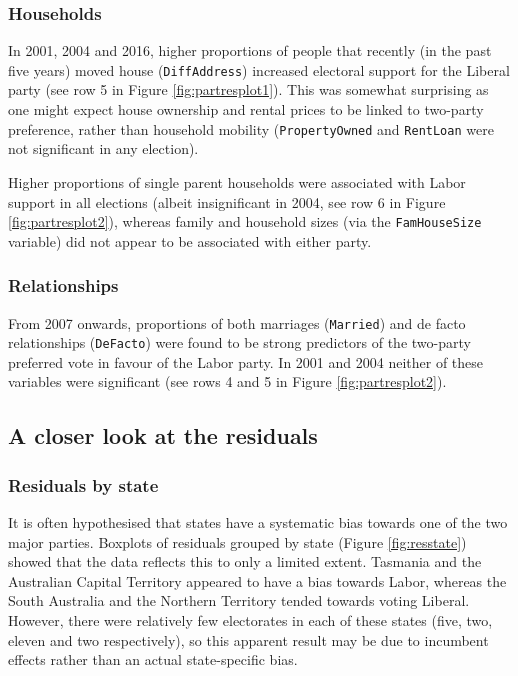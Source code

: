 \documentclass[
  times, doublespace]{anzsauth}
\begin{document}
\hypertarget{households}{%
\subsubsection*{Households}\label{households}}

In 2001, 2004 and 2016, higher proportions of people that recently (in the past five years) moved house (\texttt{DiffAddress}) increased electoral support for the Liberal party (see row 5 in Figure \ref{fig:partresplot1}). This was somewhat surprising as one might expect house ownership and rental prices to be linked to two-party preference, rather than household mobility (\texttt{PropertyOwned} and \texttt{RentLoan} were not significant in any election).

Higher proportions of single parent households were associated with Labor support in all elections (albeit insignificant in 2004, see row 6 in Figure \ref{fig:partresplot2}), whereas family and household sizes (via the \texttt{FamHouseSize} variable) did not appear to be associated with either party.

\hypertarget{relationships}{%
\subsubsection*{Relationships}\label{relationships}}

From 2007 onwards, proportions of both marriages (\texttt{Married}) and de facto relationships (\texttt{DeFacto}) were found to be strong predictors of the two-party preferred vote in favour of the Labor party. In 2001 and 2004 neither of these variables were significant (see rows 4 and 5 in Figure \ref{fig:partresplot2}).

\hypertarget{a-closer-look-at-the-residuals}{%
\subsection{A closer look at the residuals}\label{a-closer-look-at-the-residuals}}

\hypertarget{residuals-by-state}{%
\subsubsection*{Residuals by state}\label{residuals-by-state}}

It is often hypothesised that states have a systematic bias towards one of the two major parties. Boxplots of residuals grouped by state (Figure \ref{fig:resstate}) showed that the data reflects this to only a limited extent. Tasmania and the Australian Capital Territory appeared to have a bias towards Labor, whereas the South Australia and the Northern Territory tended towards voting Liberal. However, there were relatively few electorates in each of these states (five, two, eleven and two respectively), so this apparent result may be due to incumbent effects rather than an actual state-specific bias.
\end{document}
